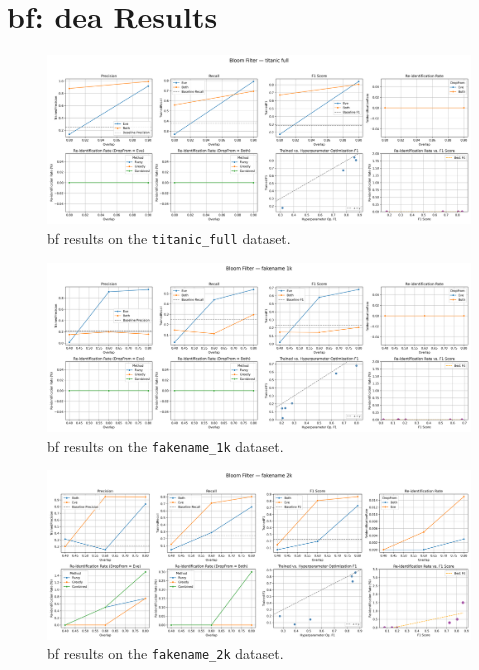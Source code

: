 \clearpage

\section{\ac{bf}: \ac{dea} Results} \label{sec:bloomfilter_results}

\begin{figure}[H]
    \centering
    \includegraphics[width=\textwidth]{figures/BloomFilter_titanic_full_metrics.png}
    \caption{\ac{bf} results on the \texttt{titanic\_full} dataset.}
    \label{fig:bloomfilter_titanic}
\end{figure}

\begin{figure}[H]
    \centering
    \includegraphics[width=\textwidth]{figures/BloomFilter_fakename_1k_metrics.png}
    \caption{\ac{bf} results on the \texttt{fakename\_1k} dataset.}
    \label{fig:bloomfilter_fakename1k}
\end{figure}

\begin{figure}[H]
    \centering
    \includegraphics[width=\textwidth]{figures/BloomFilter_fakename_2k_metrics.png}
    \caption{\ac{bf} results on the \texttt{fakename\_2k} dataset.}
    \label{fig:bloomfilter_fakename2k}
\end{figure}

